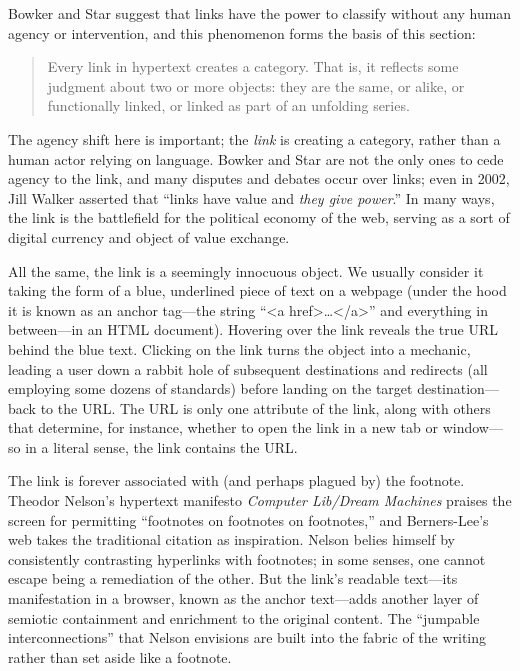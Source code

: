 Bowker and Star suggest that links have the power to classify without any human agency or intervention, and this phenomenon forms the basis of this section: \blockquote{Every link in hypertext creates a category. That is, it reflects some judgment about two or more objects: they are the same, or alike, or functionally linked, or linked as part of an unfolding series.}\autocite[7]{bowker_sorting_2000} The agency shift here is important; the \emph{link} is creating a category, rather than a human actor relying on language. Bowker and Star are not the only ones to cede agency to the link, and many disputes and debates occur over links; even in 2002, Jill Walker asserted that ``links have value and \emph{they give power}.''\autocite{walker_links_2002} In many ways, the link is the battlefield for the political economy of the web, serving as a sort of digital currency and object of value exchange.

All the same, the link is a seemingly innocuous object. We usually consider it taking the form of a blue, underlined piece of text on a webpage (under the hood it is known as an anchor tag---the string ``<a href>\ldots</a>'' and everything in between---in an HTML document). Hovering over the link reveals the true URL behind the blue text. Clicking on the link turns the object into a mechanic, leading a user down a rabbit hole of subsequent destinations and redirects (all employing some dozens of standards) before landing on the target destination---back to the URL. The URL is only one attribute of the link, along with others that determine, for instance, whether to open the link in a new tab or window---so in a literal sense, the link contains the URL.

The link is forever associated with (and perhaps plagued by) the footnote. Theodor Nelson's hypertext manifesto \emph{Computer Lib/Dream Machines} praises the screen for permitting ``footnotes on footnotes on footnotes,''\autocite[DM19]{nelson_computer_1974} and Berners-Lee's web takes the traditional citation as inspiration. Nelson belies himself by consistently contrasting hyperlinks with footnotes; in some senses, one cannot escape being a remediation of the other. But the link's readable text---its manifestation in a browser, known as the anchor text---adds another layer of semiotic containment and enrichment to the original content. The ``jumpable interconnections'' that Nelson envisions are built into the fabric of the writing rather than set aside like a footnote.

